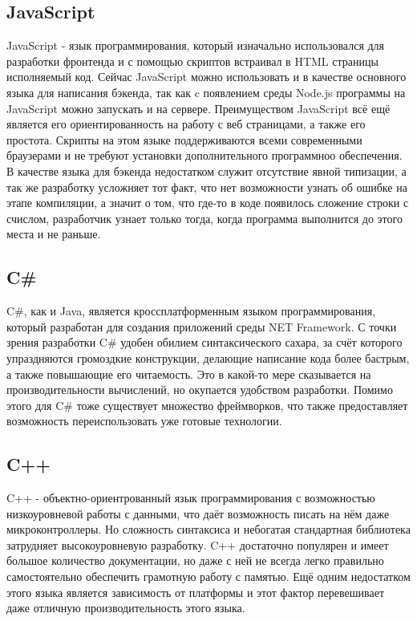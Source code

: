 \subsection{JavaScript}
JavaScript - язык программирования, который изначально использовался для разработки фронтенда и с помощью скриптов встраивал в HTML страницы исполняемый код. Сейчас JavaScript можно использовать и в качестве основного языка для написания бэкенда, так как c появлением среды Node.js программы на JavaScript можно запускать и на сервере. Преимуществом JavaScript всё ещё является его ориентированность на работу с веб страницами, а также его простота. Скрипты на этом языке поддерживаются всеми современными браузерами и не требуют установки дополнительного программноо обеспечения. В качестве языка для бэкенда недостатком служит отсутствие явной типизации, а так же разработку усложняет тот факт, что нет возможности узнать об ошибке на этапе компиляции, а значит о том, что где-то в коде появилось сложение строки с счислом, разработчик узнает только тогда, когда программа выполнится до этого места и не раньше. 

\subsection{C\#}
C\#, как и Java, является кроссплатформенным языком программирования, который разработан для создания приложений среды NET Framework. С точки зрения разработки C\# удобен обилием синтаксического сахара, за счёт которого упраздняются громоздкие конструкции, делающие написание кода более бастрым, а также повышающие его читаемость. Это в какой-то мере сказывается на производительности вычислений, но окупается удобством разработки. Помимо этого для C\# тоже существует множество фреймворков, что также предоставляет возможность переиспользовать уже готовые технологии.

\subsection{C++}
C++ - объектно-ориентрованный язык программирования с возможностью низкоуровневой работы с данными, что даёт возможность писать на нём даже микроконтроллеры. Но сложность синтаксиса и небогатая стандартная библиотека затрудняет высокоуровневую разработку. C++ достаточно популярен и имеет большое количество документации, но даже с ней не всегда легко правильно самостоятельно обеспечить грамотную работу с памятью. Ещё одним недостатком этого языка является зависимость от платформы и этот фактор перевешивает даже отличную производительность этого языка.

